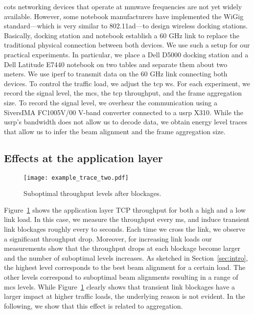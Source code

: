 \documentclass{article}
\begin{document}
\ac{cots} networking devices that operate at \ac{mmwave} frequencies are not yet widely available. However, some notebook manufacturers have implemented the WiGig \cite{wigig_overview} standard---which is very similar to 802.11ad---to design wireless docking stations. Basically, docking station and notebook establish a 60 GHz link to replace the traditional physical connection between both devices. We use such a setup for our practical experiments. In particular, we place a Dell D5000 docking station and a Dell Latitude E7440 notebook on two tables and separate them about two meters. We use iperf to transmit data on the 60 GHz link connecting both devices. To control the traffic load, we adjust the \ac{tcp} \ac{ws}. For each experiment, we record the signal level, the \ac{mcs}, the \ac{tcp} throughput, and the frame aggregation size. To record the signal level, we overhear the communication using a SiversIMA FC1005V/00 V-band converter connected to a \ac{usrp} X310. While the \ac{usrp}'s bandwidth does not allow us to decode data, we obtain energy level traces that allow us to infer the beam alignment and the frame aggregation size.

\subsection{Effects at the application layer}
\label{subsec:appl_layer_effects}

\begin{figure}
	\centering
		\texttt{[image: example\_trace\_two.pdf]}
	\caption{Suboptimal throughput levels after blockages.}
	\label{fig:example_trace}
\end{figure}

Figure~\ref{fig:example_trace} shows the application layer TCP throughput for both a high and a low link load. In this case, we measure the throughput every  ms, and induce transient link blockages roughly every  to  seconds. Each time we cross the link, we observe a significant throughput drop. Moreover, for increasing link loads our measurements show that the throughput drops at each blockage become larger and the number of suboptimal levels increases. As sketched in Section~\ref{sec:intro}, the highest level corresponds to the best beam alignment for a certain load. The other levels correspond to suboptimal beam alignments resulting in a range of \ac{mcs} levels. While Figure~\ref{fig:example_trace} clearly shows that transient link blockages have a larger impact at higher traffic loads, the underlying reason is not evident. In the following, we show that this effect is related to aggregation.
\end{document}
